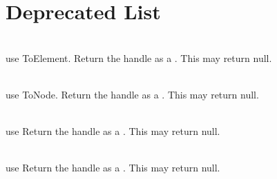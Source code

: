 \chapter{Deprecated List }
\hypertarget{deprecated}{}\label{deprecated}

\begin{DoxyRefList}
\item[{\parbox[t]{\linewidth}{Member \doxylink{class_ti_xml_handle_ac56814c76757eecc5bd951d3ed710dd2}{Ti\+Xml\+Handle::\+Element} () const}}]\hfill \\
\label{deprecated__deprecated000002}%
%
use To\+Element. Return the handle as a . This may return null.  
\item[{\parbox[t]{\linewidth}{Member \doxylink{class_ti_xml_handle_afa2eb82bacfb6e4c3dd5351ce28e5d7a}{Ti\+Xml\+Handle::\+Node} () const}}]\hfill \\
\label{deprecated__deprecated000001}%
%
use To\+Node. Return the handle as a . This may return null.  
\item[{\parbox[t]{\linewidth}{Member \doxylink{class_ti_xml_handle_a58a9b3e3d710a603038e6e291eb6d580}{Ti\+Xml\+Handle::\+Text} () const}}]\hfill \\
\label{deprecated__deprecated000003}%
%
use  Return the handle as a . This may return null.  
\item[{\parbox[t]{\linewidth}{Member \doxylink{class_ti_xml_handle_aa7a8756af3ac24f0b2d469e500b85824}{Ti\+Xml\+Handle::\+Unknown} () const}}]\hfill \\
\label{deprecated__deprecated000004}%
%
use  Return the handle as a . This may return null. 
\end{DoxyRefList}